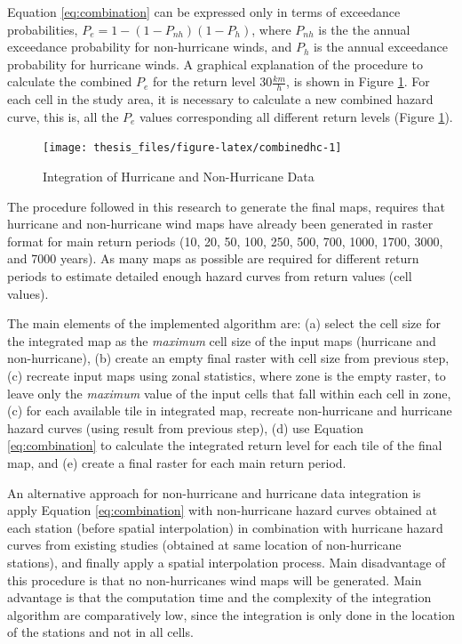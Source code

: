 \documentclass[12pt,oneside]{reedthesis}
\begin{document}
Equation \eqref{eq:combination} can be expressed only in terms of exceedance probabilities, \(P_{e} = 1 - (1 -P_{nh}) (1 - P_{h})\), where \(P_{nh}\) is the the annual exceedance probability for non-hurricane winds, and \(P_{h}\) is the annual exceedance probability for hurricane winds. A graphical explanation of the procedure to calculate the combined \(P_e\) for the return level \(30\frac{km}{h}\), is shown in Figure \ref{fig:combinedhc}. For each cell in the study area, it is necessary to calculate a new combined hazard curve, this is, all the \(P_e\) values corresponding all different return levels (Figure \ref{fig:combinedhc}).
\begin{figure}

{\centering \texttt{[image: thesis\_files/figure-latex/combinedhc-1]} 

}

\caption{Integration of Hurricane and Non-Hurricane Data}\label{fig:combinedhc}
\end{figure}
The procedure followed in this research to generate the final maps, requires that hurricane and non-hurricane wind maps have already been generated in raster format for main return periods (10, 20, 50, 100, 250, 500, 700, 1000, 1700, 3000, and 7000 years). As many maps as possible are required for different return periods to estimate detailed enough hazard curves from return values (cell values).

The main elements of the implemented algorithm are: (a) select the cell size for the integrated map as the \emph{maximum} cell size of the input maps (hurricane and non-hurricane), (b) create an empty final raster with cell size from previous step, (c) recreate input maps using zonal statistics, where zone is the empty raster, to leave only the \emph{maximum} value of the input cells that fall within each cell in zone, (c) for each available tile in integrated map, recreate non-hurricane and hurricane hazard curves (using result from previous step), (d) use Equation \eqref{eq:combination} to calculate the integrated return level for each tile of the final map, and (e) create a final raster for each main return period.

An alternative approach for non-hurricane and hurricane data integration is apply Equation \eqref{eq:combination} with non-hurricane hazard curves obtained at each station (before spatial interpolation) in combination with hurricane hazard curves from existing studies (obtained at same location of non-hurricane stations), and finally apply a spatial interpolation process. Main disadvantage of this procedure is that no non-hurricanes wind maps will be generated. Main advantage is that the computation time and the complexity of the integration algorithm are comparatively low, since the integration is only done in the location of the stations and not in all cells.
\end{document}
